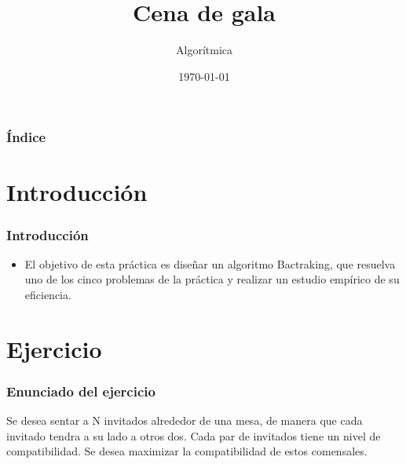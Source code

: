 \documentclass{beamer}
\title[Practica 4]{Cena de gala} %
\author{Algorítmica} %
\institute[UGR] %
{
Universidad de Granada \\ %
\medskip

}
\date{\today} %
\begin{document}
\begin{frame}
\titlepage %
\end{frame}

\begin{frame}
\frametitle{Índice} %
\tableofcontents %
\end{frame}


\section{Introducción }
\begin{frame}
	\frametitle{Introducción}
	\begin{itemize}
		\item El objetivo de esta práctica es diseñar un algoritmo Bactraking, que resuelva uno de los cinco problemas de la práctica y realizar un estudio empírico de su eficiencia.
	\end{itemize}
\end{frame}


\section{Ejercicio} 
\begin{frame}
	\frametitle{Enunciado del ejercicio}
	Se desea sentar a N invitados alrededor de una mesa, de manera que cada invitado tendra a su lado a otros dos. Cada par de invitados tiene un nivel de compatibilidad. Se desea maximizar la compatibilidad de estos comensales.
	
\end{frame}

\end{document}
